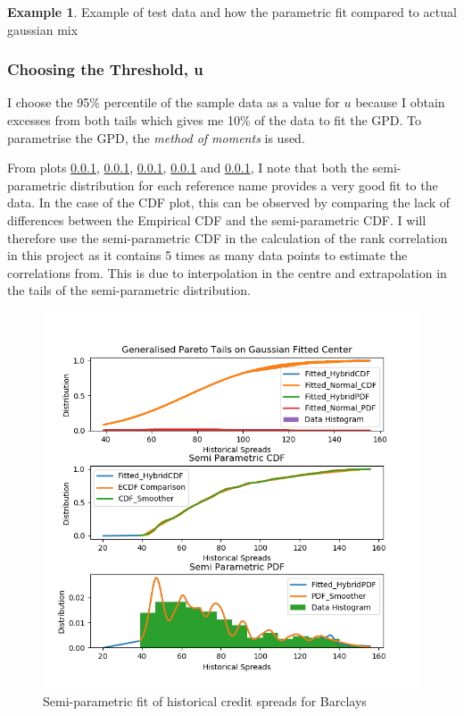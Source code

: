 \documentclass{report}
\theoremstyle{plain}
\theoremstyle{definition}
\newtheorem{exmp}[thm]{Example} %
\begin{document}
\begin{exmp}
	Example of test data and how the parametric fit compared to actual gaussian mix
\end{exmp}

\subsubsection{Choosing the Threshold, u}
I choose the 95\% percentile of the sample data as a value for $u$ because I obtain excesses from both tails which gives me 10\% of the data to fit the GPD. To parametrise the GPD, the \emph{method of moments} is used.

From plots \ref{}, \ref{}, \ref{}, \ref{} and \ref{}, I note that both the semi-parametric distribution for each reference name provides a very good fit to the data. In the case of the CDF plot, this can be observed by comparing the lack of differences between the Empirical CDF and the semi-parametric CDF. I will therefore use the semi-parametric CDF in the calculation of the rank correlation in this project as it contains 5 times as many data points to estimate the correlations from. This is due to interpolation in the centre and extrapolation in the tails of the semi-parametric distribution.

\begin{figure}[H]
	\begin{center}
		\includegraphics[width=15cm]{SemiParametricFit_BARCLAY_CDS_EUR_SR_5Y_D14.png}
		\caption{Semi-parametric fit of historical credit spreads for Barclays} 
		\label{SemiParametricFit_BARCLAY_CDS_EUR_SR_5Y_D14}
	\end{center}
\end{figure}
\end{document}
